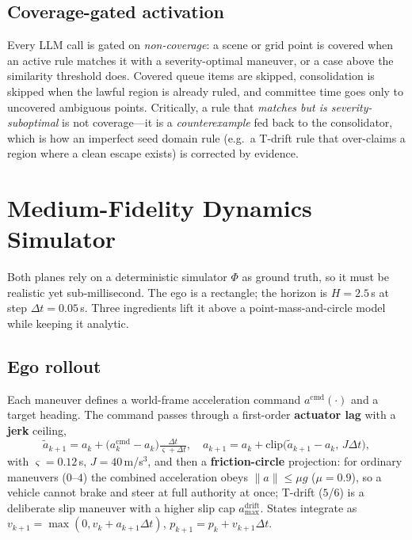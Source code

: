\documentclass[conference]{IEEEtran}
\begin{document}
\subsection{Coverage-gated activation}
Every LLM call is gated on \emph{non-coverage}: a scene or grid point is
covered when an active rule matches it with a severity-optimal maneuver, or a
case above the similarity threshold does. Covered queue items are skipped,
consolidation is skipped when the lawful region is already ruled, and
committee time goes only to uncovered ambiguous points. Critically, a rule
that \emph{matches but is severity-suboptimal} is not coverage---it is a
\emph{counterexample} fed back to the consolidator, which is how an imperfect
seed domain rule (e.g.\ a T-drift rule that over-claims a region where a
clean escape exists) is corrected by evidence.

\section{Medium-Fidelity Dynamics Simulator}
\label{sec:sim}

Both planes rely on a deterministic simulator $\Phi$ as ground truth, so it
must be realistic yet sub-millisecond. The ego is a rectangle; the horizon is
$H{=}2.5$\,s at step $\Delta t{=}0.05$\,s. Three ingredients lift it above a
point-mass-and-circle model while keeping it analytic.

\subsection{Ego rollout}
Each maneuver defines a world-frame acceleration command
$a^{\mathrm{cmd}}(\cdot)$ and a target heading. The command passes through a
first-order \textbf{actuator lag} with a \textbf{jerk} ceiling,
\begin{equation}
\tilde a_{k+1}=a_k+\big(a^{\mathrm{cmd}}_k-a_k\big)\tfrac{\Delta t}{\varsigma+\Delta t},\quad
a_{k+1}=a_k+\mathrm{clip}\big(\tilde a_{k+1}-a_k,\,J\Delta t\big),
\end{equation}
with $\varsigma{=}0.12$\,s, $J{=}40$\,m/s$^3$, and then a
\textbf{friction-circle} projection: for ordinary maneuvers ($0$--$4$) the
combined acceleration obeys $\lVert a\rVert\le\mu g$ ($\mu{=}0.9$), so a
vehicle cannot brake and steer at full authority at once; T-drift ($5$/$6$) is
a deliberate slip maneuver with a higher slip cap $a_{\max}^{\mathrm{drift}}$.
States integrate as $v_{k+1}=\max(0,v_k+a_{k+1}\Delta t)$, $p_{k+1}=p_k+v_{k+1}\Delta t$.
\end{document}
